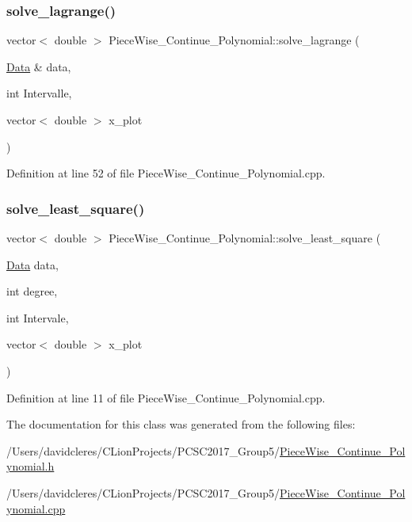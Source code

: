 \subsubsection{\texorpdfstring{solve\+\_\+lagrange()}{solve\_lagrange()}}
{\footnotesize\ttfamily vector$<$ double $>$ Piece\+Wise\+\_\+\+Continue\+\_\+\+Polynomial\+::solve\+\_\+lagrange (\begin{DoxyParamCaption}\item[{\mbox{\hyperlink{struct_data}{Data}} \&}]{data,  }\item[{int}]{Intervalle,  }\item[{vector$<$ double $>$}]{x\+\_\+plot }\end{DoxyParamCaption})}



Definition at line 52 of file Piece\+Wise\+\_\+\+Continue\+\_\+\+Polynomial.\+cpp.

\mbox{\label{class_piece_wise___continue___polynomial_ae4e6583489b97d59121f04514521a901}} 
\subsubsection{\texorpdfstring{solve\+\_\+least\+\_\+square()}{solve\_least\_square()}}
{\footnotesize\ttfamily vector$<$ double $>$ Piece\+Wise\+\_\+\+Continue\+\_\+\+Polynomial\+::solve\+\_\+least\+\_\+square (\begin{DoxyParamCaption}\item[{\mbox{\hyperlink{struct_data}{Data}}}]{data,  }\item[{int}]{degree,  }\item[{int}]{Intervale,  }\item[{vector$<$ double $>$}]{x\+\_\+plot }\end{DoxyParamCaption})}



Definition at line 11 of file Piece\+Wise\+\_\+\+Continue\+\_\+\+Polynomial.\+cpp.



The documentation for this class was generated from the following files\+:\begin{DoxyCompactItemize}
\item 
/\+Users/davidcleres/\+C\+Lion\+Projects/\+P\+C\+S\+C2017\+\_\+\+Group5/\mbox{\hyperlink{_piece_wise___continue___polynomial_8h}{Piece\+Wise\+\_\+\+Continue\+\_\+\+Polynomial.\+h}}\item 
/\+Users/davidcleres/\+C\+Lion\+Projects/\+P\+C\+S\+C2017\+\_\+\+Group5/\mbox{\hyperlink{_piece_wise___continue___polynomial_8cpp}{Piece\+Wise\+\_\+\+Continue\+\_\+\+Polynomial.\+cpp}}\end{DoxyCompactItemize}
